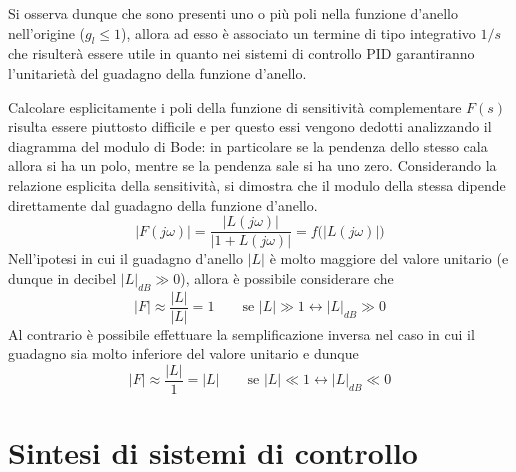 		Si osserva dunque che sono presenti uno o più poli nella funzione d'anello nell'origine ($g_l \leq 1$), allora ad esso è associato un termine di tipo integrativo $1/s$ che risulterà essere utile in quanto nei sistemi di controllo PID garantiranno l'unitarietà del guadagno della funzione d'anello.
		
		\vspace{3mm}
		Calcolare esplicitamente i poli della funzione di sensitività complementare $F(s)$ risulta essere piuttosto difficile  e per questo essi vengono dedotti analizzando il diagramma del modulo di Bode: in particolare se la pendenza dello stesso cala allora si ha un polo, mentre se la pendenza sale si ha uno zero.
		Considerando la relazione esplicita della sensitività, si dimostra che il modulo della stessa dipende direttamente dal guadagno della funzione d'anello.
		\[ |F(j\omega)| = \frac{|L(j\omega)|}{|1+L(j\omega)|} = f\big(|L(j\omega)|\big) \]
		Nell'ipotesi in cui il guadagno d'anello $|L|$ è molto maggiore del valore unitario (e dunque in decibel $|L|_{dB} \gg 0 $), allora è possibile considerare che
		\[ |F| \approx \frac{|L|}{|L|} = 1 \qquad \textrm{se } |L| \gg 1 \leftrightarrow |L|_{dB} \gg 0 \]
		Al contrario è possibile effettuare la semplificazione inversa nel caso in cui il guadagno sia molto inferiore del valore unitario e dunque
		\[ |F| \approx \frac{|L|}{1} = |L| \qquad \textrm{se } |L| \ll 1 \leftrightarrow |L|_{dB} \ll 0 \]
		
		
\section{Sintesi di sistemi di controllo}